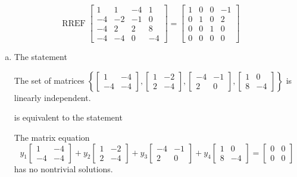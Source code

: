 \begin{exerciseAnswer} 


\[\operatorname{RREF} \left[\begin{array}{cccc}
1 & 1 & -4 & 1 \\
-4 & -2 & -1 & 0 \\
-4 & 2 & 2 & 8 \\
-4 & -4 & 0 & -4
\end{array}\right] = \left[\begin{array}{cccc}
1 & 0 & 0 & -1 \\
0 & 1 & 0 & 2 \\
0 & 0 & 1 & 0 \\
0 & 0 & 0 & 0
\end{array}\right] \]


\begin{enumerate}[(a)]
\item The statement 
\begin{center}\begin{minipage}{0.8\textwidth}
 The set of matrices \( \left\{ \left[\begin{array}{cc}
1 & -4 \\
-4 & -4
\end{array}\right] , \left[\begin{array}{cc}
1 & -2 \\
2 & -4
\end{array}\right] , \left[\begin{array}{cc}
-4 & -1 \\
2 & 0
\end{array}\right] , \left[\begin{array}{cc}
1 & 0 \\
8 & -4
\end{array}\right] \right\} \) is linearly independent.
\end{minipage}\end{center}
     is equivalent to the statement 
\begin{center}\begin{minipage}{0.8\textwidth}
 The matrix equation \[ y_{1} \left[\begin{array}{cc}
1 & -4 \\
-4 & -4
\end{array}\right] + y_{2} \left[\begin{array}{cc}
1 & -2 \\
2 & -4
\end{array}\right] + y_{3} \left[\begin{array}{cc}
-4 & -1 \\
2 & 0
\end{array}\right] + y_{4} \left[\begin{array}{cc}
1 & 0 \\
8 & -4
\end{array}\right] = \left[\begin{array}{cc}
0 & 0 \\
0 & 0
\end{array}\right] \] has no nontrivial solutions. 
\end{minipage}\end{center}
    

\end{enumerate}
\end{exerciseAnswer}
